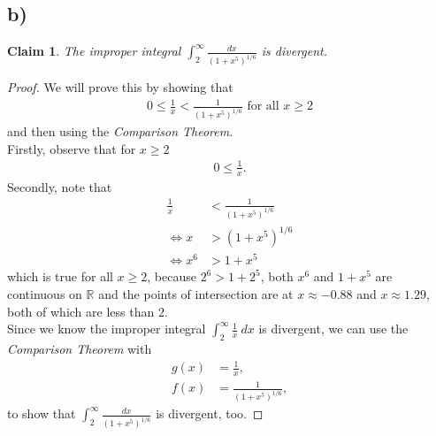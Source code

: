\documentclass{article}
\newcommand{\R}{\mathbb{R}}
\newtheorem{claim}[section]{Claim}
\begin{document}
\subsection*{b)}
\begin{claim}
  The improper integral $\int_2^\infty \frac{dx}{(1+x^5)^{1/6}}$ is divergent.
\end{claim}
\begin{proof}
  We will prove this by showing that
  \begin{align*}
    0\leq \frac{1}{x}<\frac{1}{(1+x^5)^{1/6}} \text{ for all } x \geq 2
  \end{align*}
  and then using the \emph{Comparison Theorem}.\\
  Firstly, observe that for $x\geq 2$
  \begin{align*}
    0 \leq \frac{1}{x}.
  \end{align*}
  Secondly, note that
  \begin{align*}
    \frac{1}{x}&<\frac{1}{(1+x^5)^{1/6}}\\
    \Leftrightarrow x &>(1+x^5)^{1/6}\\
    \Leftrightarrow x^6 &> 1+x^5
  \end{align*}
  which is true for all $x\geq 2$, because $2^6 > 1 + 2^5$, both $x^6$ and $1+x^5$ are continuous on $\R$ and the points of intersection are at $x\approx -0.88$ and $x\approx 1.29$, both of which are less than $2$.\\
  Since we know the improper integral $\int_2^\infty \frac{1}{x}\:dx$ is divergent, we can use the \emph{Comparison Theorem} with
  \begin{align*}
    g(x)&=\frac{1}{x},\\
    f(x)&=\frac{1}{(1+x^5)^{1/6}},
  \end{align*}
  to show that $\int_2^\infty \frac{dx}{(1+x^5)^{1/6}}$ is divergent, too.
\end{proof}
\end{document}
